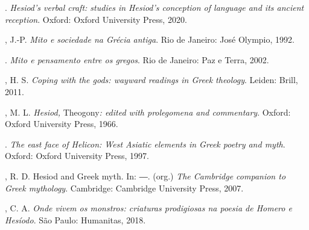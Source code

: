 \begin{bibliohedra}
\titidem. \emph{Hesiod's verbal craft: studies in Hesiod's conception of
language and its ancient reception}. Oxford: Oxford University Press,
2020.

, J.-P. \emph{Mito e sociedade na Grécia antiga}. Rio de Janeiro:
José Olympio, 1992.

\titidem. \emph{Mito e pensamento entre os gregos}. Rio de Janeiro: Paz e
Terra, 2002.

, H. S. \emph{Coping with the gods: wayward readings in Greek
theology}. Leiden: Brill, 2011.

, M. L. \emph{Hesiod,} Theogony\emph{: edited with prolegomena and
commentary}. Oxford: Oxford University Press, 1966.

\titidem. \emph{The east face of Helicon: West Asiatic elements in Greek poetry
and myth}. Oxford: Oxford University Press, 1997.

, R. D. Hesiod and Greek myth. In: ―. (org.) \emph{The Cambridge
companion to Greek mythology}. Cambridge: Cambridge University Press,
2007.

, C. A. \emph{Onde vivem os monstros: criaturas prodigiosas na
poesia de Homero e Hesíodo}. São Paulo: Humanitas, 2018.
\end{bibliohedra}

